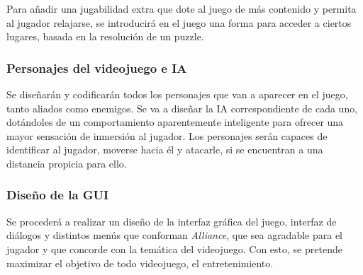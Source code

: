 Para añadir una jugabilidad extra que dote al juego de más contenido y permita al jugador relajarse, se introducirá en el juego una forma para acceder a ciertos lugares, basada en la resolución de un puzzle. 

\subsubsection{Personajes del videojuego e \ac{IA}}

Se diseñarán y codificarán todos los personajes que van a aparecer en el juego, tanto aliados como enemigos. Se va a diseñar la \ac{IA} correspondiente de cada uno, dotándoles de un comportamiento aparentemente inteligente para ofrecer una mayor sensación de inmersión al jugador. Los personajes serán capaces de identificar al jugador, moverse hacia él y atacarle, si se encuentran a una distancia propicia para ello.

\subsubsection{Diseño de la \ac{GUI}}

Se procederá a realizar un diseño de la interfaz gráfica del juego, interfaz de diálogos y distintos menús que conforman \textit{Alliance}, que sea agradable para el jugador y que concorde con la temática del videojuego. Con esto, se pretende maximizar el objetivo de todo videojuego, el entretenimiento.